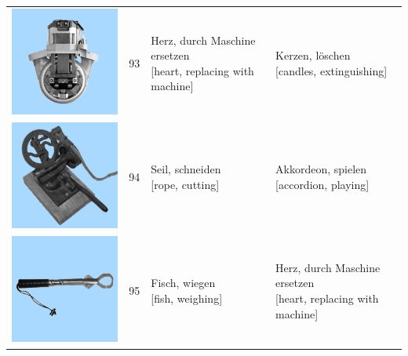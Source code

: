\documentclass[
  english,
  man,floatsintext]{apa7}
\begin{document}
\begin{center}
\begin{ThreePartTable}
{\begin{longtable}{llll}
\includegraphics[valign=c, scale=0.23]{../materials/unfamiliar/93.png} & 93 & \makecell[l]{Herz, durch Maschine ersetzen\\{[heart, replacing with machine]}} & \makecell[l]{Kerzen, löschen\\{[candles, extinguishing]}}\\
\includegraphics[valign=c, scale=0.23]{../materials/unfamiliar/94.png} & 94 & \makecell[l]{Seil, schneiden\\{[rope, cutting]}} & \makecell[l]{Akkordeon, spielen\\{[accordion, playing]}}\\
\includegraphics[valign=c, scale=0.23]{../materials/unfamiliar/95.png} & 95 & \makecell[l]{Fisch, wiegen\\{[fish, weighing]}} & \makecell[l]{Herz, durch Maschine ersetzen\\{[heart, replacing with machine]}}\\

\end{longtable}}
\end{ThreePartTable}
\end{center}
\end{document}
